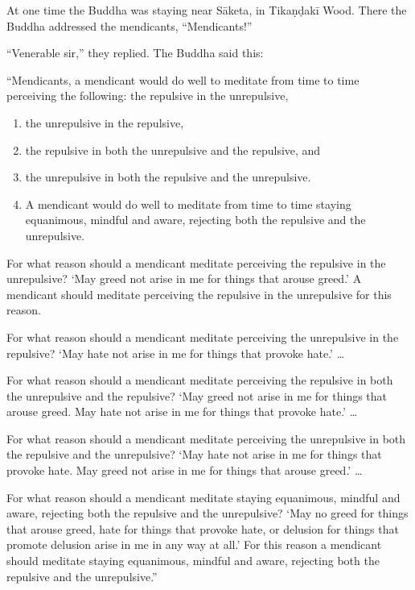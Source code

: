 \documentclass[12pt,openany]{book}%
\begin{document}
At one time the Buddha was staying near \textsanskrit{Sāketa}, in \textsanskrit{Tikaṇḍakī} Wood. There the Buddha addressed the mendicants, “Mendicants!” 

“Venerable sir,” they replied. The Buddha said this: 

“Mendicants, a mendicant would do well to meditate from time to time perceiving the following: the repulsive in the unrepulsive, 

\begin{enumerate}%
\item the unrepulsive in the repulsive, %
\item the repulsive in both the unrepulsive and the repulsive, and %
\item the unrepulsive in both the repulsive and the unrepulsive. %
\item A mendicant would do well to meditate from time to time staying equanimous, mindful and aware, rejecting both the repulsive and the unrepulsive. %
\end{enumerate}

For what reason should a mendicant meditate perceiving the repulsive in the unrepulsive? ‘May greed not arise in me for things that arouse greed.’ A mendicant should meditate perceiving the repulsive in the unrepulsive for this reason. 

For what reason should a mendicant meditate perceiving the unrepulsive in the repulsive? ‘May hate not arise in me for things that provoke hate.’ … 

For what reason should a mendicant meditate perceiving the repulsive in both the unrepulsive and the repulsive? ‘May greed not arise in me for things that arouse greed. May hate not arise in me for things that provoke hate.’ … 

For what reason should a mendicant meditate perceiving the unrepulsive in both the repulsive and the unrepulsive? ‘May hate not arise in me for things that provoke hate. May greed not arise in me for things that arouse greed.’ … 

For what reason should a mendicant meditate staying equanimous, mindful and aware, rejecting both the repulsive and the unrepulsive? ‘May no greed for things that arouse greed, hate for things that provoke hate, or delusion for things that promote delusion arise in me in any way at all.’ For this reason a mendicant should meditate staying equanimous, mindful and aware, rejecting both the repulsive and the unrepulsive.” 
\end{document}
